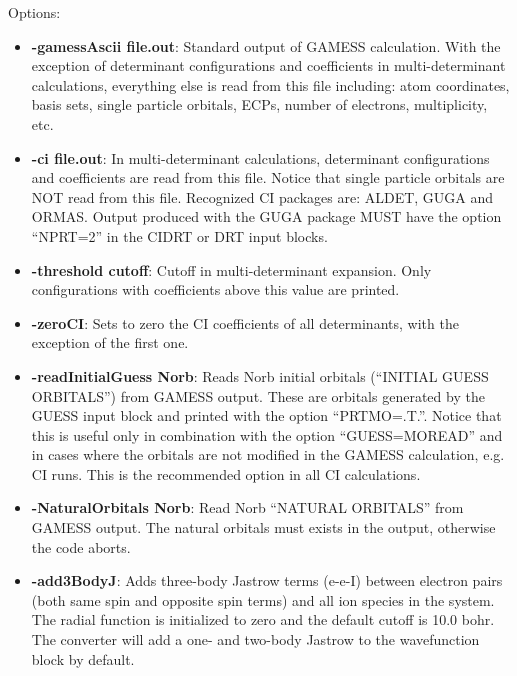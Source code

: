 Options:
\begin{itemize}
\item{\textbf{-gamessAscii file.out}: Standard output of GAMESS calculation. With the exception 
of determinant configurations and coefficients in multi-determinant calculations,
everything else is read from this file including: atom coordinates, basis sets, single
particle orbitals, ECPs, number of electrons, multiplicity, etc.}

\item{\textbf{-ci file.out}: In multi-determinant calculations, determinant configurations and 
coefficients are read from this file. Notice that single particle orbitals are NOT read
from this file. Recognized CI packages are: ALDET, GUGA and ORMAS. Output
produced with the GUGA package MUST have the option “NPRT=2” in the CIDRT
or DRT input blocks.}

\item{\textbf{-threshold cutoff}: Cutoff in multi-determinant expansion. Only configurations with
coefficients above this value are printed.}

\item{\textbf{-zeroCI}: Sets to zero the CI coefficients of all determinants, with the exception of the
first one.}

\item{\textbf{-readInitialGuess Norb}: Reads Norb initial orbitals (“INITIAL GUESS ORBITALS”) 
from GAMESS output. These are orbitals generated by the GUESS input
block and printed with the option “PRTMO=.T.”. Notice that this is useful only in
combination with the option “GUESS=MOREAD” and in cases where the orbitals
are not modified in the GAMESS calculation, e.g. CI runs. This is the recommended
option in all CI calculations.}

\item{\textbf{-NaturalOrbitals Norb}: Read Norb “NATURAL ORBITALS” from GAMESS
output. The natural orbitals must exists in the output, otherwise the code aborts.}

\item{\textbf{-add3BodyJ}: Adds three-body Jastrow terms (e-e-I) between electron pairs (both
same spin and opposite spin terms) and all ion species in the system. The radial
function is initialized to zero and the default cutoff is 10.0 bohr. The converter will
add a one- and two-body Jastrow to the wavefunction block by default.}
\end{itemize}

